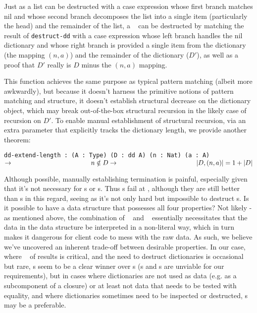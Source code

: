 Just as a list can be destructed with a case expression whose first branch matches nil and whose second branch
decomposes the list into a single item (particularly the head) and the remainder of the list, a \dd~ can be
destructed by matching the result of \texttt{destruct-dd} with a case expression whose left branch handles the
nil dictionary and whose right branch is provided a single item from the dictionary (the mapping $(n, a)$)
and the remainder of the dictionary ($D'$), as well as a proof that $D'$ really is $D$ minus the $(n, a)$
mapping.

This function achieves the same purpose as typical pattern matching (albeit more awkwardly), but because it
doesn't harness the primitive notions of pattern matching and structure, it doesn't establish structural
decrease on the dictionary object, which may break out-of-the-box structural recursion in the likely case
of recursion on $D'$. To enable manual establishment of structural recursion, via an extra parameter that
explicitly tracks the dictionary length, we provide another theorem:

\texttt{dd-extend-length : (A : Type) (D : dd A) (n : Nat) (a : A) $\rightarrow \\
\phantom{xxxxxxxxxxxxxxxxxxxxx} n \notin D \rightarrow \\
\phantom{xxxxxxxxxxxxxxxxxxxxx} |D, (n, a)| = 1 + |D|$}

Although possible, manually establishing termination is painful, especially given that it's not necessary
for {\SAL}s or {\CAL}s. Thus {\dd}s fail at \EzDstr, although they are still better than {\FPF}s in this
regard, seeing as it's not only hard but impossible to destruct {\FPF}s. Is it possible to have a data
structure that possesses all four properties? Not likely - as mentioned above, the combination of
\SemInj~ and \SemTot~ essentially
necessitates that the data in the data structure be interpreted in a non-literal way, which in turn
makes it dangerous for client code to mess with the raw data. As such, we believe we've uncovered an
inherent trade-off between desirable properties. In our case, where \EqDec~ of results is critical,
and the need to destruct dictionaries is occasional but rare, {\dd}s seem to be a clear winner over
{\CAL}s ({\SAL}s and {\FPF}s are unviable for our requirements), but in cases where dictionaries are
not used as data
(e.g. as a subcomponent of a closure) or at least not data that needs to be tested with equality, and
where dictionaries sometimes need to be inspected or destructed, {\CAL}s may be a preferable.
